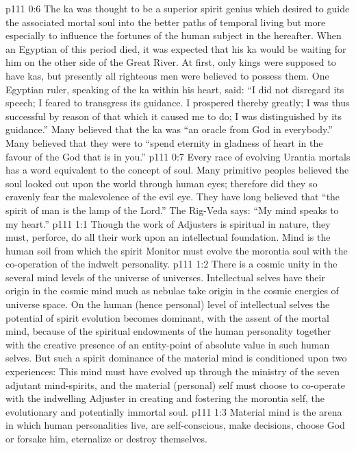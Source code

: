\vs p111 0:6 The ka was thought to be a superior spirit genius which desired to guide the associated mortal soul into the better paths of temporal living but more especially to influence the fortunes of the human subject in the hereafter. When an Egyptian of this period died, it was expected that his ka would be waiting for him on the other side of the Great River. At first, only kings were supposed to have kas, but presently all righteous men were believed to possess them. One Egyptian ruler, speaking of the ka within his heart, said: “I did not disregard its speech; I feared to transgress its guidance. I prospered thereby greatly; I was thus successful by reason of that which it caused me to do; I was distinguished by its guidance.” Many believed that the ka was “an oracle from God in everybody.” Many believed that they were to “spend eternity in gladness of heart in the favour of the God that is in you.”
\vs p111 0:7 Every race of evolving Urantia mortals has a word equivalent to the concept of soul. Many primitive peoples believed the soul looked out upon the world through human eyes; therefore did they so cravenly fear the malevolence of the evil eye. They have long believed that “the spirit of man is the lamp of the Lord.” The Rig\hyp{}Veda says: “My mind speaks to my heart.”
\vs p111 1:1 Though the work of Adjusters is spiritual in nature, they must, perforce, do all their work upon an intellectual foundation. Mind is the human soil from which the spirit Monitor must evolve the morontia soul with the co\hyp{}operation of the indwelt personality.
\vs p111 1:2 There is a cosmic unity in the several mind levels of the universe of universes. Intellectual selves have their origin in the cosmic mind much as nebulae take origin in the cosmic energies of universe space. On the human (hence personal) level of intellectual selves the potential of spirit evolution becomes dominant, with the assent of the mortal mind, because of the spiritual endowments of the human personality together with the creative presence of an entity\hyp{}point of absolute value in such human selves. But such a spirit dominance of the material mind is conditioned upon two experiences: This mind must have evolved up through the ministry of the seven adjutant mind\hyp{}spirits, and the material (personal) self must choose to co\hyp{}operate with the indwelling Adjuster in creating and fostering the morontia self, the evolutionary and potentially immortal soul.
\vs p111 1:3 \pc Material mind is the arena in which human personalities live, are self\hyp{}conscious, make decisions, choose God or forsake him, eternalize or destroy themselves.
